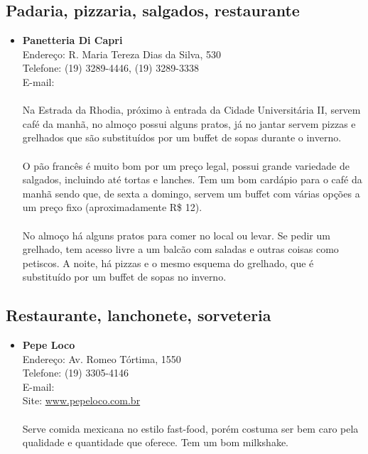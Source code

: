 \subsection{Padaria, pizzaria, salgados, restaurante}

\begin{itemize}
\item \textbf{Panetteria Di Capri}
  \\Endereço: R. Maria Tereza Dias da Silva, 530
  \\Telefone: (19) 3289-4446, (19) 3289-3338
  \\E-mail: 
  \\
  \\Na Estrada da Rhodia, próximo à entrada da Cidade Universitária II, servem
  café da manhã, no almoço possui alguns pratos, já no jantar servem pizzas e
  grelhados que são substituídos por um buffet de sopas durante o inverno.
  \\
  \\O pão francês é muito bom por um preço legal, possui grande variedade de
  salgados, incluindo até tortas e lanches. Tem um bom cardápio para o café da
  manhã sendo que, de sexta a domingo, servem um buffet com várias opções a um
  preço fixo (aproximadamente R\$ 12).
  \\
  \\No almoço há alguns pratos para comer no local ou levar. Se pedir um
  grelhado, tem acesso livre a um balcão com saladas e outras coisas como
  petiscos. A noite, há pizzas e o mesmo esquema do grelhado, que é substituído
  por um buffet de sopas no inverno.
\end{itemize}

\subsection{Restaurante, lanchonete, sorveteria}

\begin{itemize}
\item \textbf{Pepe Loco}
  \\Endereço: Av. Romeo Tórtima, 1550
  \\Telefone: (19) 3305-4146
  \\E-mail: 
  \\Site: \url{www.pepeloco.com.br}
  \\
  \\Serve comida mexicana no estilo fast-food, porém costuma ser bem caro pela
  qualidade e quantidade que oferece. Tem um bom milkshake.
\end{itemize}

